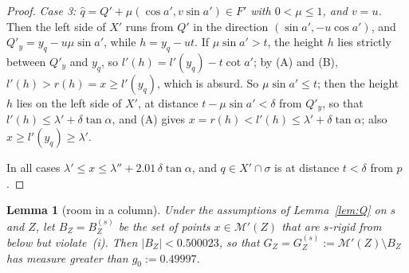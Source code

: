 \documentclass[11pt]{amsart}
\newtheorem{lemma}[theorem]{Lemma}
\theoremstyle{definition}
\theoremstyle{remark}
\begin{document}
\begin{proof}
\emph{Case 3: $\hat q=Q'+\mu(\cos a',v\sin a')\in F'$ with $0<\mu\le1$, and $v=u$.} Then the left side of $X'$ runs from $Q'$ in the
direction $(\sin a',-u\cos a')$, and $Q'_y=y_q-u\mu\sin a'$, while $h=y_q-ut$. If $\mu\sin a'>t$, the height $h$ lies strictly between
$Q'_y$ and $y_q$, so $l'(h)=l'(y_q)-t\cot a'$; by (A) and (B), $l'(h)>r(h)=x\ge l'(y_q)$, which is absurd. So $\mu\sin a'\le t$; then
the height $h$ lies on the left side of $X'$, at distance $t-\mu\sin a'<\delta$ from $Q'_y$, so that $l'(h)\le\lambda'+\delta\tan\alpha$,
and (A) gives $x=r(h)<l'(h)\le\lambda'+\delta\tan\alpha$; also $x\ge l'(y_q)\ge\lambda'$.

In all cases $\lambda'\le x\le\lambda''+2.01\,\delta\tan\alpha$, and $q\in X'\cap\sigma$ is at distance $t<\delta$ from $p$.
\end{proof}

\begin{lemma}[room in a column]\label{lem:GZ}
Under the assumptions of Lemma~\ref{lem:Q} on $s$ and $Z$, let $B_Z=B_Z^{(s)}$ be the set of points $x\in\mathcal M'(Z)$ that are
$s$-rigid from below but violate~(i). Then $|B_Z|<0.500023$, so that $G_Z=G_Z^{(s)}:=\mathcal M'(Z)\setminus B_Z$ has measure greater than
$g_0:=0.49997$.
\end{lemma}
\end{document}
